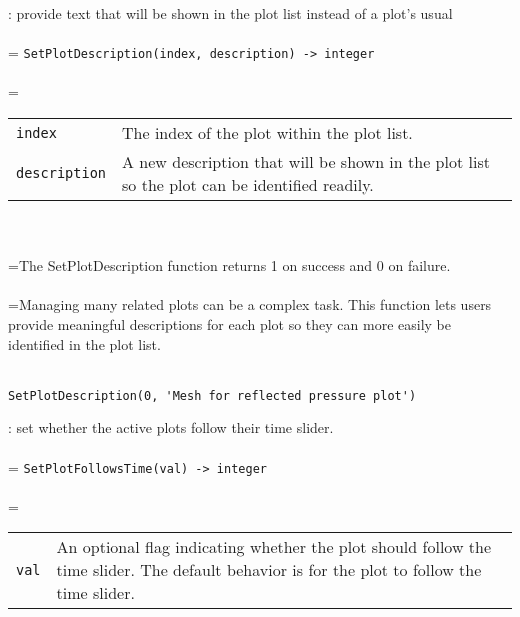 \documentclass[10pt,a4paper]{report}
\begin{document}
{}
: provide text that will be shown in the plot list instead of a plot's usual\\[-3mm]

 \\ 
\hangindent=\parindent 
\verb!SetPlotDescription(index, description) -> integer!\\ [-3mm]

 \\ 
\hangindent=\parindent 
\begin{tabular}{lp{9cm}}
\verb!index! & The index of the plot within the plot list. \\
\verb!description! & A new description that will be shown in the plot list so the plot can be identified readily. \\
\end{tabular} \\[-2mm]


 \\ 
\hangindent=\parindent The SetPlotDescription function returns 1 on success and 0 on failure. \\[-3mm] 

 \\ 
\hangindent=\parindent Managing many related plots can be a complex task. This function lets users provide meaningful descriptions for each plot so they can more easily be identified in the plot list. \\[-3mm] 

\\[-6mm]
\begin{verbatim}SetPlotDescription(0, 'Mesh for reflected pressure plot')
\end{verbatim}
\newpage


{}
: set whether the active plots follow their time slider.\\[-3mm]

 \\ 
\hangindent=\parindent 
\verb!SetPlotFollowsTime(val) -> integer!\\ [-3mm]

 \\ 
\hangindent=\parindent 
\begin{tabular}{lp{9cm}}
\verb!val! & An optional flag indicating whether the plot should follow the time slider. The default behavior is for the plot to follow the time slider. \\
\end{tabular} \\[-2mm]
\end{document}
